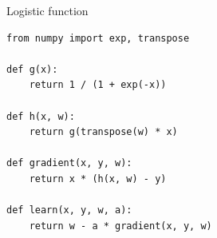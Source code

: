 \begin{frame}[fragile]
  \begin{block}{Logistic function}
    \begin{lstlisting}
from numpy import exp, transpose

def g(x):
    return 1 / (1 + exp(-x))

def h(x, w):
    return g(transpose(w) * x)

def gradient(x, y, w):
    return x * (h(x, w) - y)

def learn(x, y, w, a):
    return w - a * gradient(x, y, w)
    \end{lstlisting}
  \end{block}
\end{frame}
